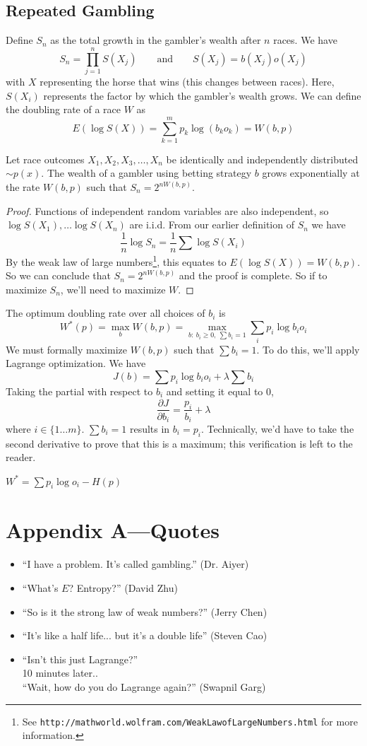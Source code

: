 \documentclass[11pt]{article}
\theoremstyle{definition}
\begin{document}
\subsection{Repeated Gambling}

Define $S_n$ as the total growth in the gambler's wealth after $n$ races. We have $$S_n = \prod_{j=1}^n S(X_j) \qquad \text{and} \qquad S(X_j) = b(X_j) o(X_j)$$with $X$ representing the horse that wins (this changes between races). Here, $S(X_i)$ represents the factor by which the gambler's wealth grows. We can define the doubling rate of a race $W$ as $$E(\log S(X)) = \sum_{k=1}^m p_k \log (b_k o_k) = W(b, p)$$

\theorem Let race outcomes $X_1, X_2, X_3, \dots, X_n$ be identically and independently distributed $\sim p(x)$. The wealth of a gambler using betting strategy $b$ grows exponentially at the rate $W(b, p)$ such that $S_n = 2^{n W(b, p)}$.

\begin{proof}
Functions of independent random variables are also independent, so $\log S(X_1), \dots \log S(X_n)$ are i.i.d. From our earlier definition of $S_n$ we have $$\frac{1}{n} \log S_n = \frac{1}{n} \sum \log S(X_i)$$By the weak law of large numbers\footnote{See \texttt{http://mathworld.wolfram.com/WeakLawofLargeNumbers.html} for more information.}, this equates to $E(\log S(X)) = W(b, p)$. So we can conclude that $S_n =  2^{n W(b, p)}$ and the proof is complete. So if to maximize $S_n$, we'll need to maximize $W$. 
\end{proof}
 The optimum doubling rate over all choices of $b_i$ is $$W^*(p) = \max_b W(b, p) = \max_{b: \: b_i \geq 0, \: \sum b_i = 1} \sum_i p_i \log b_i o_i$$We must formally maximize $W(b, p)$ such that $\sum b_i = 1$. To do this, we'll apply Lagrange optimization. We have $$J(b) = \sum p_i \log b_i o_i + \lambda \sum b_i$$Taking the partial with respect to $b_i$ and setting it equal to 0, $$\frac{\partial J}{\partial b_i} = \frac{p_i}{b_i} + \lambda$$ where $i \in \{ 1 \dots m \}$. $\sum b_i = 1$ results in $b_i = p_i$. Technically, we'd have to take the second derivative to prove that this is a maximum; this verification is left to the reader. 

\theorem $W^* = \sum p_i \log o_i - H(p)$
\newpage
\section*{Appendix A---Quotes}
\begin{itemize}
\item ``I have a problem. It's called gambling.'' (Dr. Aiyer)
\item ``What's $E$? Entropy?'' (David Zhu)
\item ``So is it the strong law of weak numbers?'' (Jerry Chen)
\item ``It's like a half life... but it's a double life'' (Steven Cao)
\item ``Isn't this just Lagrange?''  \\ 10 minutes later.. \\ ``Wait, how do you do Lagrange again?'' (Swapnil Garg)
\end{itemize}
\end{document}
